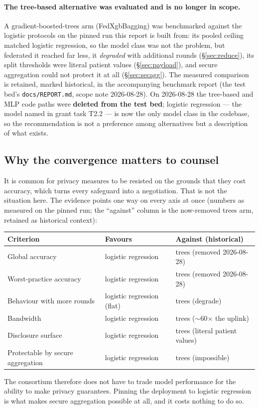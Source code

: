 \paragraph{The tree-based alternative was evaluated and is no longer in scope.} A
gradient-boosted-trees arm (FedXgbBagging) was benchmarked against the logistic protocols on the
pinned run this report is built from: its pooled ceiling matched logistic regression, so the model
class was not the problem, but federated it reached far less, it \emph{degraded} with additional
rounds (\S\ref{sec:reduce}), its split thresholds were literal patient values
(\S\ref{sec:payload}), and secure aggregation could not protect it at all (\S\ref{sec:secagg}).
The measured comparison is retained, marked historical, in the accompanying benchmark report
(the test bed's \texttt{docs/REPORT.md}, scope note 2026-08-28). On 2026-08-28 the tree-based and MLP
code paths were \textbf{deleted from the test bed}; logistic regression --- the model named in
grant task T2.2 --- is now the only model class in the codebase, so the recommendation is not a
preference among alternatives but a description of what exists.

\subsection{Why the convergence matters to counsel}

It is common for privacy measures to be resisted on the grounds that they cost accuracy, which turns
every safeguard into a negotiation. That is not the situation here. The evidence points one way on
every axis at once (numbers as measured on the pinned run; the ``against'' column is the
now-removed trees arm, retained as historical context):

\begin{center}
\small
\begin{tabular}{lll}
  \toprule
  Criterion & Favours & Against (historical) \\
  \midrule
  Global accuracy & logistic regression & trees (removed 2026-08-28) \\
  Worst-practice accuracy & logistic regression & trees (removed 2026-08-28) \\
  Behaviour with more rounds & logistic regression (flat) & trees (degrade) \\
  Bandwidth & logistic regression & trees ($\sim$60$\times$ the uplink) \\
  Disclosure surface & logistic regression & trees (literal patient values) \\
  Protectable by secure aggregation & logistic regression & trees (impossible) \\
  \bottomrule
\end{tabular}
\end{center}

The consortium therefore does not have to trade model performance for the ability to make privacy
guarantees. Pinning the deployment to logistic regression is what makes secure aggregation possible
at all, and it costs nothing to do so.
